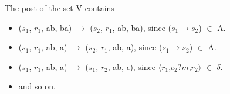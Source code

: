The post of the set V contains
\begin{itemize}
\item
($s_1$, $r_1$, ab, ba) $\rightarrow$ ($s_2$, $r_1$, ab, ba), since ($s_1$$\rightarrow$$s_2$) $\in$ A.
\item
($s_1$, $r_1$, ab, a) $\rightarrow$ ($s_2$, $r_1$, ab, a), since ($s_1$$\rightarrow$$s_2$) $\in$ A.
\item
($s_1$, $r_1$, ab, a) $\rightarrow$ ($s_1$, $r_2$, ab, $\epsilon$), since $\langle$$r_1$,$c_2?m$,$r_2$$\rangle$ $\in$ $\delta$.
\item
and so on.
\end{itemize}
